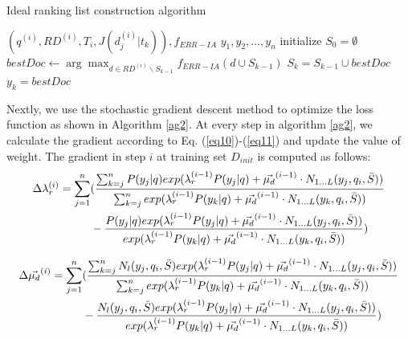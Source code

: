 \documentclass[review]{elsarticle}
\begin{document}
\begin{algorithm}[htb]
	\caption{Ideal ranking list construction algorithm}
	\begin{algorithmic}[1]
		\REQUIRE $(q^{(i)}, RD^{(i)}, T_i, J(d_j^{(i)}|t_k)), f_{ERR-IA}$
		\ENSURE $y_1,y_2,...,y_n$
		\STATE initialize $S_0=\emptyset$
		\STATE $bestDoc\leftarrow \arg\max_{d\in RD^{(i)}\backslash S_{k-1}}f_{ERR-IA}(d\cup S_{k-1})$
		\STATE $S_k=S_{k-1}\cup bestDoc$
		\STATE $y_k=bestDoc$
		\ENDFOR
	\end{algorithmic}
	\label{ag1}
\end{algorithm}

Nextly, we use the stochastic gradient descent method to optimize the loss function as shown in Algorithm \ref{ag2}. At every step in algorithm \ref{ag2}, we calculate the gradient according to Eq. (\ref{eq10})-(\ref{eq11}) and update the value of weight. The gradient in step $i$ at training set $D_{init}$ is computed as follows:
\begin{align}
	\Delta\lambda_r^{(i)}=\sum_{j=1}^{n}&(\frac{\sum_{k=j}^{n}P(y_j|q)exp(\lambda_r^{(i-1)}P(y_j|q)+\vec{\mu_d}^{(i-1)}\cdot N_{1...L}(y_j,q_i,\bar{S}))}{\sum_{k=j}^{n}exp(\lambda_r^{(i-1)}P(y_k|q)+\vec{\mu_d}^{(i-1)}\cdot N_{1...L}(y_k,q_i,\bar{S}))} \notag \\
	 &-\frac{P(y_j|q)exp(\lambda_r^{(i-1)}P(y_j|q)+\vec{\mu_d}^{(i-1)}\cdot N_{1...L}(y_j,q_i,\bar{S}))}{exp(\lambda_r^{(i-1)}P(y_k|q)+\vec{\mu_d}^{(i-1)}\cdot N_{1...L}(y_k,q_i,\bar{S}))})
	 \label{eq10}
\end{align}

\begin{align}
	\Delta\vec{\mu_d}^{(i)}=\sum_{j=1}^{n}&(\frac{\sum_{k=j}^{n}N_l(y_j,q_i,\bar{S})exp(\lambda_r^{(i-1)}P(y_j|q)+\vec{\mu_d}^{(i-1)}\cdot N_{1...L}(y_j,q_i,\bar{S}))}{\sum_{k=j}^{n}exp(\lambda_r^{(i-1)}P(y_k|q)+\vec{\mu_d}^{(i-1)}\cdot N_{1...L}(y_k,q_i,\bar{S}))} \notag \\
	&-\frac{N_l(y_j,q_i,\bar{S})exp(\lambda_r^{(i-1)}P(y_j|q)+\vec{\mu_d}^{(i-1)}\cdot N_{1...L}(y_j,q_i,\bar{S}))}{exp(\lambda_r^{(i-1)}P(y_k|q)+\vec{\mu_d}^{(i-1)}\cdot N_{1...L}(y_k,q_i,\bar{S}))})
	\label{eq11}
\end{align}
\end{document}
